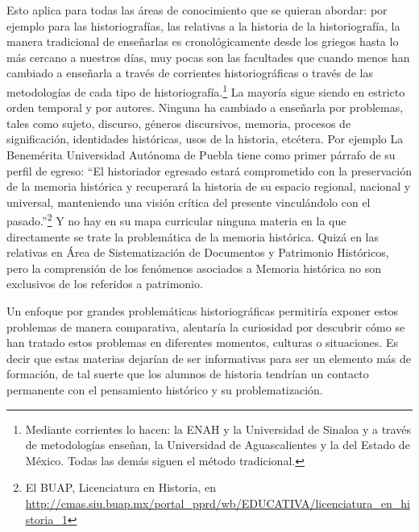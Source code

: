 Esto aplica para todas las áreas de conocimiento que se quieran 
abordar: por ejemplo para las historiografías, las relativas a la 
historia de la historiografía, la manera tradicional de enseñarlas es 
cronológicamente desde los griegos hasta lo más cercano a nuestros 
días, muy pocas son las facultades que cuando menos han cambiado a 
enseñarla a través de corrientes historiográficas o través de las 
metodologías de cada tipo de historiografía.\footnote{ Mediante 
corrientes lo hacen: la ENAH y la Universidad de Sinaloa y a través de 
metodologías enseñan, la Universidad de Aguascalientes y la del Estado 
de México. Todas las demás siguen el método tradicional. }  La mayoría 
sigue siendo en estricto orden temporal y por autores. Ninguna ha 
cambiado a enseñarla por problemas, tales como sujeto, discurso, 
géneros discursivos, memoria, procesos de significación, identidades 
históricas, usos de la historia, etcétera. Por ejemplo La Benemérita 
Universidad Autónoma de Puebla tiene como primer párrafo de su perfil 
de egreso: “El historiador egresado estará comprometido con la 
preservación de la memoria histórica y recuperará la historia de su 
espacio regional, nacional y universal, manteniendo una visión crítica 
del presente vinculándolo con el pasado.”\footnote{ El BUAP, 
Licenciatura en Historia, en 
\url{http://cmas.siu.buap.mx/portal_pprd/wb/EDUCATIVA/licenciatura_en_historia_1} 
} Y no hay en su mapa curricular ninguna materia en la que directamente 
se trate la problemática de la memoria histórica. Quizá en las 
relativas en Área de Sistematización de Documentos y Patrimonio 
Históricos, pero la comprensión de los fenómenos asociados a Memoria 
histórica no son exclusivos de los referidos a patrimonio. 

Un enfoque por grandes problemáticas historiográficas permitiría exponer
estos problemas de manera comparativa, alentaría la curiosidad por
descubrir cómo se han tratado estos problemas en diferentes momentos,
culturas o situaciones. Es decir que estas materias dejarían de ser
informativas para ser un elemento más de formación, de tal suerte que los
alumnos de historia tendrían un contacto permanente con el pensamiento
histórico y su problematización. 

